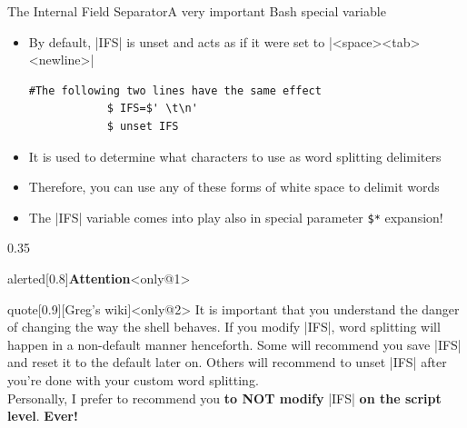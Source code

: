 \begin{frame}[fragile]{The Internal Field Separator}{A very important Bash special variable }
    \vspace{-3mm}
    \begin{itemize}
        \item By default, \bash|IFS| is unset and acts as if it were set to \bash|<space><tab><newline>|
        \begin{lstlisting}[style=MyBash, numbers=none, xrightmargin=15mm, belowskip=-6mm, aboveskip=2mm]
            #The following two lines have the same effect
            $ IFS=$' \t\n'
            $ unset IFS
        \end{lstlisting}
        \item It is used to determine what characters to use as word splitting delimiters
        \item Therefore, you can use any of these forms of white space to delimit words
        \item The \bash|IFS| variable comes into play also in special parameter \texttt{\$*} expansion!
    \end{itemize}
    \begin{overlayarea}{\textwidth}{0.35\textheight}
        \begin{varblock}{alerted}[0.8\textwidth]{\Large \textbf{Attention}}<only@1>
        \end{varblock}
        \PrepareURLsymbol[PB]
        \vspace{-2mm}
        \begin{varblock}{quote}[0.9\textwidth]{}[Greg's wiki]<only@2>
            It is important that you understand the danger of changing the way the shell behaves.
            If you modify \textnormal{\bash|IFS|}, word splitting will happen in a non-default manner henceforth.
            Some will recommend you save \textnormal{\bash|IFS|} and reset it to the default later on.
            Others will recommend to unset \textnormal{\bash|IFS|} after you're done with your custom word splitting.\\
            Personally, I prefer to recommend you \textbf{to NOT modify} \textnormal{\bash|IFS|} \textbf{on the script level}.
            \alert{\textbf{Ever!}}\\[-0.7em] ~
        \end{varblock}
    \end{overlayarea}
\end{frame}

